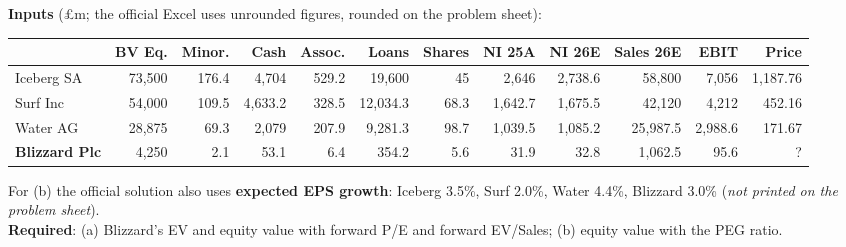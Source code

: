 \begin{exbox}
\textbf{Inputs} (\pounds m; the official Excel uses unrounded figures, rounded on the problem sheet):
\begin{center}
\scriptsize\setlength{\tabcolsep}{3pt}
\begin{tabular}{@{}lrrrrrrrrrrr@{}}
\toprule
 & BV Eq. & Minor. & Cash & Assoc. & Loans & Shares & NI 25A & NI 26E & Sales 26E & EBIT & Price\\
\midrule
Iceberg SA & 73,500 & 176.4 & 4,704 & 529.2 & 19,600 & 45 & 2,646 & 2,738.6 & 58,800 & 7,056 & 1,187.76\\
Surf Inc & 54,000 & 109.5 & 4,633.2 & 328.5 & 12,034.3 & 68.3 & 1,642.7 & 1,675.5 & 42,120 & 4,212 & 452.16\\
Water AG & 28,875 & 69.3 & 2,079 & 207.9 & 9,281.3 & 98.7 & 1,039.5 & 1,085.2 & 25,987.5 & 2,988.6 & 171.67\\
\textbf{Blizzard Plc} & 4,250 & 2.1 & 53.1 & 6.4 & 354.2 & 5.6 & 31.9 & 32.8 & 1,062.5 & 95.6 & ?\\
\bottomrule
\end{tabular}
\end{center}
For (b) the official solution also uses \textbf{expected EPS growth}: Iceberg 3.5\%, Surf 2.0\%, Water 4.4\%, Blizzard 3.0\% (\emph{not printed on the problem sheet}).\\
\textbf{Required}: (a) Blizzard's EV and equity value with forward P/E and forward EV/Sales; (b) equity value with the PEG ratio.


\end{exbox}
